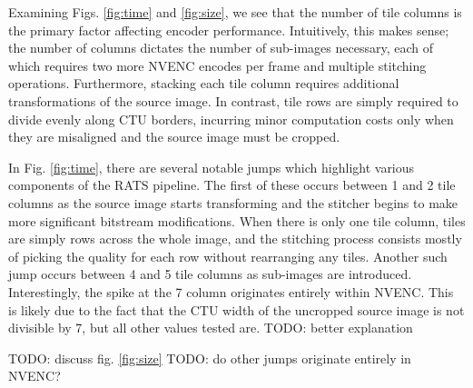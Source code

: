 Examining Figs. \ref{fig:time} and \ref{fig:size}, we see that the number of tile columns is the primary factor affecting encoder performance. Intuitively, this makes sense; the number of columns dictates the number of sub-images necessary, each of which requires two more NVENC encodes per frame and multiple stitching operations. Furthermore, stacking each tile column requires additional transformations of the source image. In contrast, tile rows are simply required to divide evenly along CTU borders, incurring minor computation costs only when they are misaligned and the source image must be cropped.

In Fig. \ref{fig:time}, there are several notable jumps which highlight various components of the RATS pipeline. The first of these occurs between 1 and 2 tile columns as the source image starts transforming and the stitcher begins to make more significant bitstream modifications. When there is only one tile column, tiles are simply rows across the whole image, and the stitching process consists mostly of picking the quality for each row without rearranging any tiles. Another such jump occurs between 4 and 5 tile columns as sub-images are introduced. Interestingly, the spike at the 7 column originates entirely within NVENC. This is likely due to the fact that the CTU width of the uncropped source image is not divisible by 7, but all other values tested are. TODO: better explanation

TODO: discuss fig. \ref{fig:size}
TODO: do other jumps originate entirely in NVENC?






